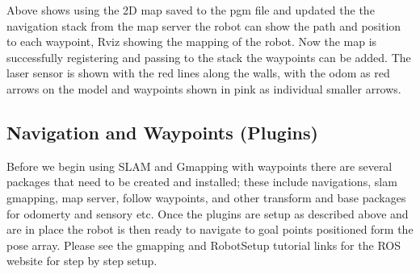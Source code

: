 \documentclass[a4paper, 10pt]{IEEEconf}
\begin{document}
Above shows using the 2D map saved to the pgm file and updated the the navigation stack from the map server the robot can show the path and position to each waypoint, Rviz showing the mapping of the robot. Now the map is successfully registering and passing to the stack the waypoints can be added. The laser sensor is shown with the red lines along the walls, with the odom as red arrows on the model and waypoints shown in pink as individual smaller arrows.


\clearpage
\subsection{Navigation and Waypoints (Plugins)}


Before we begin using SLAM and Gmapping with waypoints there are several packages that need to be created and installed; these include navigations, slam gmapping, map server, follow waypoints, and other transform and base packages for odomerty and sensory etc. Once the plugins are setup as described above and are in place the robot is then ready to navigate to goal points positioned form the pose array. Please see the gmapping and RobotSetup tutorial links for the ROS website for step by step setup.
\end{document}
